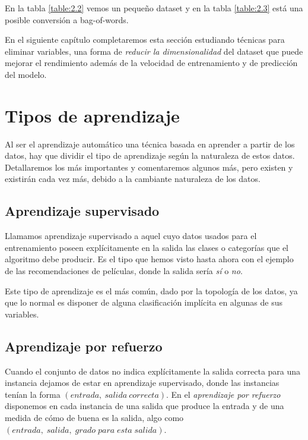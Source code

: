 En la tabla \ref{table:2.2} vemos un pequeño dataset y en la tabla \ref{table:2.3} está una posible conversión a bag-of-words.

En el siguiente capítulo completaremos esta sección estudiando técnicas para eliminar variables, una forma de \emph{reducir la dimensionalidad} del dataset que puede mejorar el rendimiento además de la velocidad de entrenamiento y de predicción del modelo.

\section{Tipos de aprendizaje} \label{sec:2.3}

Al ser el aprendizaje automático una técnica basada en aprender a partir de los datos, hay que dividir el tipo de aprendizaje según la naturaleza de estos datos. Detallaremos los más importantes y comentaremos algunos más, pero existen y existirán cada vez más, debido a la cambiante naturaleza de los datos.

\subsection{Aprendizaje supervisado} \label{subsec:2.3.1}

Llamamos aprendizaje supervisado a aquel cuyo datos usados para el entrenamiento poseen explícitamente en la salida las clases o categorías que el algoritmo debe producir. Es el tipo que hemos visto hasta ahora con el ejemplo de las recomendaciones de películas, donde la salida sería \emph{sí} o \emph{no}.

Este tipo de aprendizaje es el más común, dado por la topología de los datos, ya que lo normal es disponer de alguna clasificación implícita en algunas de sus variables.

\subsection{Aprendizaje por refuerzo} \label{subsec:2.3.2}

Cuando el conjunto de datos no indica explícitamente la salida correcta para una instancia dejamos de estar en aprendizaje supervisado, donde las instancias tenían la forma $(entrada,\:salida\:correcta)$. En el \emph{aprendizaje por refuerzo} disponemos en cada instancia de una salida que produce la entrada y de una medida de cómo de buena es la salida, algo como $(entrada,\;salida,\;grado\;para\;esta\;salida)$.

